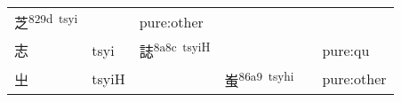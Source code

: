 \documentclass[14pt,a4paper]{scrartcl}
\begin{document}
\begin{longtable}[c]{@{}llllll@{}}
\begin{minipage}[t]{0.14\columnwidth}\raggedright\strut
芝\textsuperscript{829d~tsyi}
\strut\end{minipage} &
\begin{minipage}[t]{0.14\columnwidth}\raggedright\strut
\strut\end{minipage} &
\begin{minipage}[t]{0.14\columnwidth}\raggedright\strut
pure:other
\strut\end{minipage}\tabularnewline
\begin{minipage}[t]{0.14\columnwidth}\raggedright\strut
志
\strut\end{minipage} &
\begin{minipage}[t]{0.14\columnwidth}\raggedright\strut
tsyi
\strut\end{minipage} &
\begin{minipage}[t]{0.14\columnwidth}\raggedright\strut
誌\textsuperscript{8a8c~tsyiH}
\strut\end{minipage} &
\begin{minipage}[t]{0.14\columnwidth}\raggedright\strut
\strut\end{minipage} &
\begin{minipage}[t]{0.14\columnwidth}\raggedright\strut
\strut\end{minipage} &
\begin{minipage}[t]{0.14\columnwidth}\raggedright\strut
pure:qu
\strut\end{minipage}\tabularnewline
\begin{minipage}[t]{0.14\columnwidth}\raggedright\strut
㞢
\strut\end{minipage} &
\begin{minipage}[t]{0.14\columnwidth}\raggedright\strut
tsyiH
\strut\end{minipage} &
\begin{minipage}[t]{0.14\columnwidth}\raggedright\strut
\strut\end{minipage} &
\begin{minipage}[t]{0.14\columnwidth}\raggedright\strut
蚩\textsuperscript{86a9~tsyhi}
\strut\end{minipage} &
\begin{minipage}[t]{0.14\columnwidth}\raggedright\strut
\strut\end{minipage} &
\begin{minipage}[t]{0.14\columnwidth}\raggedright\strut
pure:other
\strut\end{minipage}\tabularnewline
\bottomrule
\end{longtable}
\end{document}
